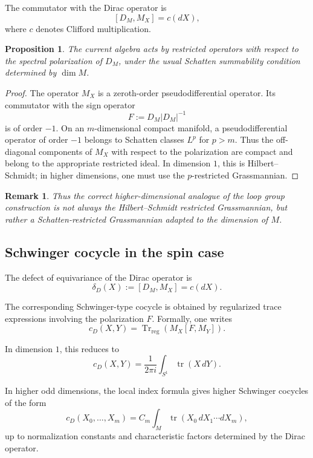 \documentclass[11pt]{amsart}
\newtheorem{proposition}[definition]{Proposition}
\newtheorem{remark}[definition]{Remark}
\begin{document}
The commutator with the Dirac operator is
\[
[D_M,M_X]=c(dX),
\]
where \(c\) denotes Clifford multiplication.

\begin{proposition}
The current algebra acts by restricted operators with respect to the spectral polarization of \(D_M\), under the usual Schatten summability condition determined by \(\dim M\).
\end{proposition}

\begin{proof}
The operator \(M_X\) is a zeroth-order pseudodifferential operator. Its commutator with the sign operator
\[
F:=D_M|D_M|^{-1}
\]
is of order \(-1\). On an \(m\)-dimensional compact manifold, a pseudodifferential operator of order \(-1\) belongs to Schatten classes \(L^p\) for \(p>m\). Thus the off-diagonal components of \(M_X\) with respect to the polarization are compact and belong to the appropriate restricted ideal. In dimension \(1\), this is Hilbert--Schmidt; in higher dimensions, one must use the \(p\)-restricted Grassmannian.
\end{proof}

\begin{remark}
Thus the correct higher-dimensional analogue of the loop group construction is not always the Hilbert--Schmidt restricted Grassmannian, but rather a Schatten-restricted Grassmannian adapted to the dimension of \(M\).
\end{remark}

\subsection{Schwinger cocycle in the spin case}

The defect of equivariance of the Dirac operator is
\[
\delta_D(X):=[D_M,M_X]=c(dX).
\]

The corresponding Schwinger-type cocycle is obtained by regularized trace expressions involving the polarization \(F\). Formally, one writes
\[
c_D(X,Y)
=
\operatorname{Tr}_{\mathrm{reg}}
\left(
M_X[F,M_Y]
\right).
\]

In dimension \(1\), this reduces to
\[
c_D(X,Y)
=
\frac{1}{2\pi i}\int_{S^1}\operatorname{tr}(X\,dY).
\]

In higher odd dimensions, the local index formula gives higher Schwinger cocycles of the form
\[
c_D(X_0,\ldots,X_m)
=
C_m\int_M
\operatorname{tr}
\left(
X_0\,dX_1\cdots dX_m
\right),
\]
up to normalization constants and characteristic factors determined by the Dirac operator.
\end{document}
